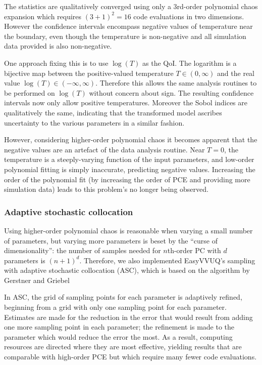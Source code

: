The statistics are qualitatively converged using only a 3rd-order polynomial
chaos expansion which requires $(3+1)^2=16$ code evaluations in two
dimensions.
However the confidence intervals encompass negative values of temperature
near the boundary, even though the temperature is non-negative and all
simulation data provided is also non-negative.

One approach fixing this is to use $\log(T)$ as the QoI.
The logarithm is a bijective map between the positive-valued temperature
$T\in(0,\infty)$ and the real value $\log(T)\in(-\infty,\infty)$.
Therefore this allows the same analysis routines to be performed on $\log(T)$
without concern about sign.
The resulting confidence intervals now only allow positive temperatures.
Moreover the Sobol indices are qualitatively the same,
indicating that the transformed model ascribes uncertainty to the various
parameters in a similar fashion.

However, considering higher-order polynomial chaos it becomes apparent that
the negative values are an artefact of the data analysis routine.
Near $T=0$, the temperature is a steeply-varying function of the input
parameters, and low-order polynomial fitting is simply inaccurate, predicting
negative values.
Increasing the order of the polynomial fit (by increasing the order of PCE
and providing more simulation data) leads to this problem's no longer being
observed.

\subsubsection{Adaptive stochastic collocation}\label{sec:asc}

Using higher-order polynomial chaos is reasonable when varying a small number
of parameters, but varying more parameters is beset by the ``curse of
dimensionality'': the number of samples needed for $n$th-order PC with $d$ parameters is $(n+1)^d$.
Therefore, we also implemented EasyVVUQ's sampling with adaptive stochastic
collocation (ASC), which is based on the algorithm by Gerstner and Griebel
\cite{Gerstner03}

In ASC, the grid of sampling points for each parameter is adaptively refined,
beginning from a grid with only one sampling point for each parameter.
Estimates are made for the reduction in the error that would result from
adding one more sampling point in each parameter;
the refinement is made to the parameter which would reduce the error the most.
As a result, computing resources are directed where they are most effective,
yielding results that are comparable with high-order PCE but which require
many fewer code evaluations.

